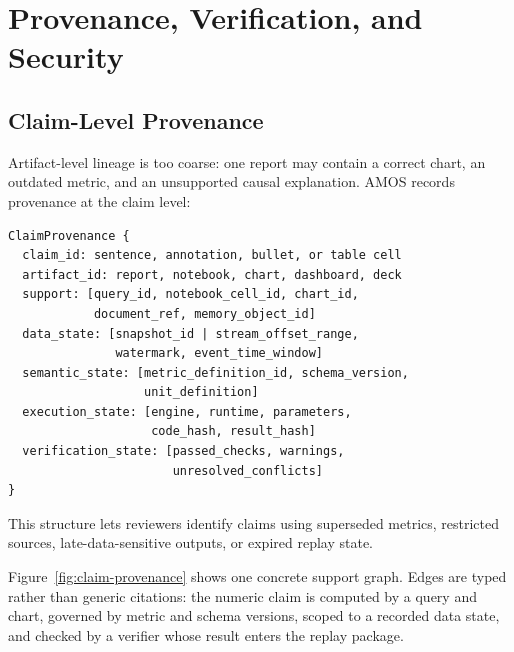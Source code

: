 \documentclass[sigconf,nonacm]{acmart}
\newcommand{\amos}{\textsc{AMOS}\xspace}
\begin{document}
\section{Provenance, Verification, and Security}

\subsection{Claim-Level Provenance}
Artifact-level lineage is too coarse: one report may contain a correct chart, an outdated metric, and an unsupported causal explanation. \amos records provenance at the claim level:

{\scriptsize
\begin{verbatim}
ClaimProvenance {
  claim_id: sentence, annotation, bullet, or table cell
  artifact_id: report, notebook, chart, dashboard, deck
  support: [query_id, notebook_cell_id, chart_id,
            document_ref, memory_object_id]
  data_state: [snapshot_id | stream_offset_range,
               watermark, event_time_window]
  semantic_state: [metric_definition_id, schema_version,
                   unit_definition]
  execution_state: [engine, runtime, parameters,
                    code_hash, result_hash]
  verification_state: [passed_checks, warnings,
                       unresolved_conflicts]
}
\end{verbatim}
}

This structure lets reviewers identify claims using superseded metrics, restricted sources, late-data-sensitive outputs, or expired replay state.

Figure~\ref{fig:claim-provenance} shows one concrete support graph. Edges are typed rather than generic citations: the numeric claim is computed by a query and chart, governed by metric and schema versions, scoped to a recorded data state, and checked by a verifier whose result enters the replay package.
\end{document}
